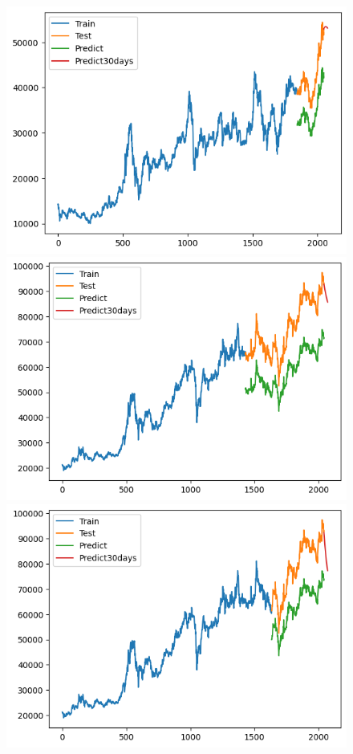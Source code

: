 \begin{figure}[H]
\begin{minipage}{0.15\textwidth}
    \centering
    \includegraphics[width=1\textwidth]{resources/chapter-5/result/BIDV_GRU_9-1.png}
    \end{minipage}
    \hfill
    \begin{minipage}{0.15\textwidth}
    \centering
    \includegraphics[width=1\textwidth]{resources/chapter-5/result/VCB_GRU_7-3.png}
    \end{minipage}
    \hfill
    \begin{minipage}{0.15\textwidth}
    \centering
    \includegraphics[width=1\textwidth]{resources/chapter-5/result/VCB_GRU_8-2.png}

\end{minipage}
\end{figure}
